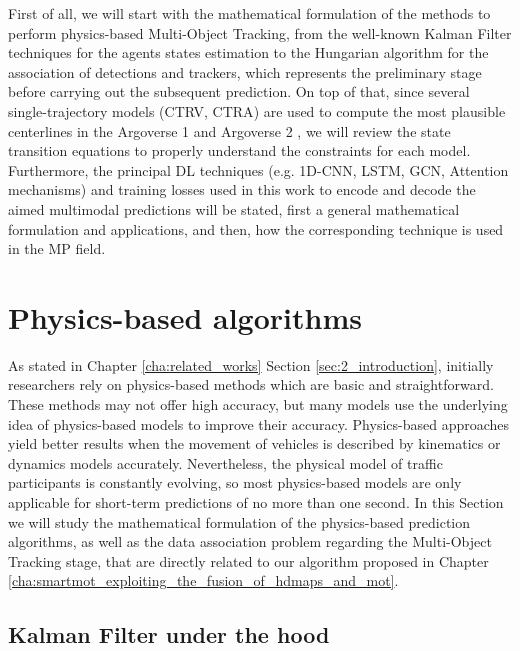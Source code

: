 First of all, we will start with the mathematical formulation of the methods to perform physics-based Multi-Object Tracking, from the well-known Kalman Filter techniques \cite{kalman1960new} for the agents states estimation to the Hungarian algorithm \cite{kuhn1955hungarian} for the association of detections and trackers, which represents the preliminary stage before carrying out the subsequent prediction. On top of that, since several single-trajectory models (\ac{CTRV}, \ac{CTRA}) are used to compute the most plausible centerlines in the Argoverse 1 \cite{chang2019argoverse} and Argoverse 2 \cite{wilson2023argoverse}, we will review the state transition equations to properly understand the constraints for each model. Furthermore, the principal \ac{DL} techniques (e.g. 1D-CNN, LSTM, GCN, Attention mechanisms) and training losses used in this work to encode and decode the aimed multimodal predictions will be stated, first a general mathematical formulation and applications, and then, how the corresponding technique is used in the \ac{MP} field.

\section{Physics-based algorithms}
\label{sec:3_pb_formulation}


As stated in Chapter \ref{cha:related_works} Section \ref{sec:2_introduction}, initially researchers rely on physics-based methods which are basic and straightforward. These methods may not offer high accuracy, but many models use the underlying idea of physics-based models to improve their accuracy. Physics-based approaches yield better results when the movement of vehicles is described by kinematics or dynamics models accurately. Nevertheless, the physical model of traffic participants is constantly evolving, so most physics-based models are only applicable for short-term predictions of no more than one second. In this Section we will study the mathematical formulation of the physics-based prediction algorithms, as well as the data association problem regarding the Multi-Object Tracking stage, that are directly related to our algorithm proposed in Chapter \ref{cha:smartmot_exploiting_the_fusion_of_hdmaps_and_mot}.

\subsection{Kalman Filter under the hood}
\label{subsec:3_kf_formulation}

